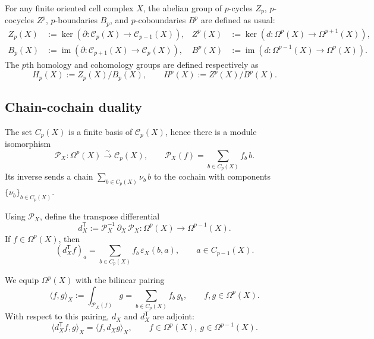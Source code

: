 For any finite oriented cell complex \(X\), the abelian group of $p$-cycles $Z_p$, $p$-cocycles $Z^p$, $p$-boundaries $B_p$, and $p$-coboundaries $B^p$ are defined as usual:
\begin{align}
	Z_p(X)
	&:=
	\ker \left(\partial:\mathcal C_p(X)\to \mathcal C_{p-1}(X)\right),
	&
	Z^p(X)
	&:=
	\ker \left(d:\Omega^p(X)\to \Omega^{p+1}(X)\right),
	\nonumber\\
	B_p(X)
	&:=
	\operatorname{im} \left(\partial:\mathcal C_{p+1}(X)\to \mathcal C_p(X)\right),
	&
	B^p(X)
	&:=
	\operatorname{im} \left(d:\Omega^{p-1}(X)\to \Omega^p(X)\right).
	\label{eq:ZB}
\end{align}
The $p$th homology and cohomology groups are defined respectively as
\begin{equation}
	H_p(X):=Z_p(X)/B_p(X),
	\qquad
	H^p(X):=Z^p(X)/B^p(X).
	\label{eq:cohomology}
\end{equation}

\subsection{Chain-cochain duality}

The set \(C_p(X)\) is a finite basis of
\(\mathcal C_p(X)\), hence there is a module isomorphism
\begin{equation}
	\mathcal P_X:\Omega^p(X)\xrightarrow{\sim}\mathcal C_p(X),
	\qquad
	\mathcal P_X(f)=\sum_{b\in C_p(X)} f_b\,b.
	\label{eq:PX}
\end{equation}
Its inverse sends a chain \(\sum_{b\in C_p(X)}\nu_b\,b\) to the cochain with components
\(\{\nu_b\}_{b\in C_p(X)}\).

Using \(\mathcal P_X\), define the transpose differential
\begin{equation}
	d_X^{\mathsf T}
	:=
	\mathcal P_X^{-1}\,\partial_X\,\mathcal P_X
	:
	\Omega^p(X)\to \Omega^{p-1}(X).
	\label{eq:dT-def}
\end{equation}
If \(f\in \Omega^p(X)\), then
\begin{equation}
	(d_X^{\mathsf T}f)_a
	=
	\sum_{b\in C_p(X)} f_b\,\varepsilon_X(b,a),
	\qquad
	a\in C_{p-1}(X).
	\label{eq:dT-components}
\end{equation}

We equip \(\Omega^p(X)\) with the bilinear pairing
\begin{equation}
	\langle f,g\rangle_X
	:=
	\int_{\mathcal P_X(f)} g
	=
	\sum_{b\in C_p(X)} f_b\,g_b,
	\qquad
	f,g\in \Omega^p(X).
	\label{eq:bilinear-pairing}
\end{equation}
With respect to this pairing, \(d_X\) and \(d_X^{\mathsf T}\) are adjoint:
\begin{equation}
	\langle d_X^{\mathsf T}f,g\rangle_X
	=
	\langle f,d_X g\rangle_X,
	\qquad
	f\in \Omega^p(X),\ g\in \Omega^{p-1}(X).
	\label{eq:adjoint-d-dT}
\end{equation}

